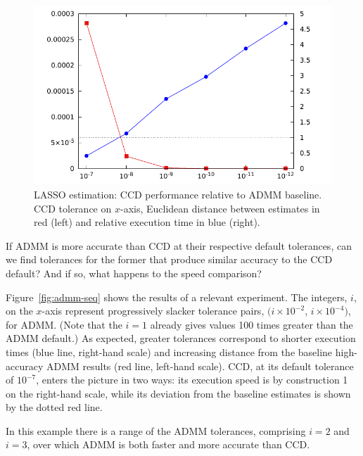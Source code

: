 \documentclass{article}
\begin{document}
\begin{figure}[htbp]
\begin{center}
\includegraphics[scale=0.9]{ccd_admm.pdf}
\caption{LASSO estimation: CCD performance relative to ADMM
  baseline. CCD tolerance on $x$-axis, Euclidean distance between
  estimates in red (left) and relative execution time in blue
  (right).}
\label{fig:ccd-admm}
\end{center}
\end{figure}

If ADMM is more accurate than CCD at their respective default
tolerances, can we find tolerances for the former that produce similar
accuracy to the CCD default? And if so, what happens to the speed
comparison?

Figure~\ref{fig:admm-seq} shows the results of a relevant
experiment. The integers, $i$, on the $x$-axis represent progressively
slacker tolerance pairs, $(i\times 10^{-2}$, $i\times 10^{-4})$, for
ADMM.  (Note that the $i=1$ already gives values 100 times greater
than the ADMM default.) As expected, greater tolerances correspond to
shorter execution times (blue line, right-hand scale) and increasing
distance from the baseline high-accuracy ADMM results (red line,
left-hand scale).  CCD, at its default tolerance of $10^{-7}$, enters
the picture in two ways: its execution speed is by construction 1 on
the right-hand scale, while its deviation from the baseline estimates
is shown by the dotted red line.

In this example there is a range of the ADMM tolerances, comprising
$i=2$ and $i=3$, over which ADMM is both faster and more accurate than
CCD.
\end{document}
